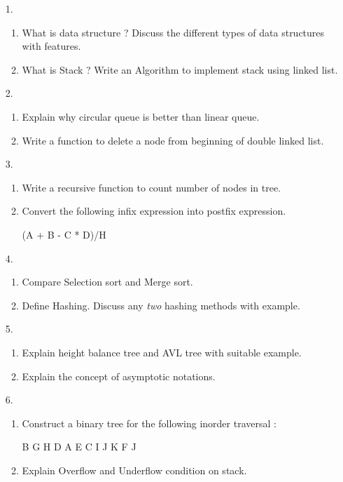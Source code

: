 \documentclass[12pt]{article}
\begin{document}
\begin{enumerate}

	\item[1.]
	\begin{enumerate}
		\item What is data structure ? Discuss the different types of data structures with features.
		\item What is Stack ? Write an Algorithm to implement stack using linked list.
	\end{enumerate}

	\item[2.]
	\begin{enumerate}
		\item Explain why circular queue is better than linear queue.
		\item Write a function to delete a node from beginning of double linked list.
	\end{enumerate}

	\item[3.]
	\begin{enumerate}
		\item Write a recursive function to count number of nodes in tree.
		\item Convert the following infix expression into postfix expression.
			\begin{center}
				(A + B - C * D)/H
			\end{center}
	\end{enumerate}

	\item[4.]
	\begin{enumerate}
		\item Compare Selection sort and Merge sort.
		\item Define Hashing. Discuss any \textit{two} hashing methods with example.
	\end{enumerate}

	\item[5.]
	\begin{enumerate}
		\item Explain height balance tree and AVL tree with suitable example.
		\item Explain the concept of asymptotic notations.
	\end{enumerate}

	\item[6.]
	\begin{enumerate}
		\item Construct a binary tree for the following inorder traversal :
			\begin{center}
				B G H D A E C I J K F J
			\end{center}
		\item Explain Overflow and Underflow condition on stack.
	\end{enumerate}


\end{enumerate}
\end{document}
